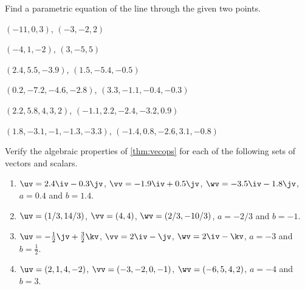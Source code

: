 \begin{exercise} \label{ex:} 
Find a parametric equation of the line through the given two points.
\begin{parts}
\item \((-11,0,3)\),
   \((-3,-2,2)\)

\item \((-4,1,-2)\),
   \((3,-5,5)\)

\item \((2.4,5.5,-3.9)\),
   \((1.5,-5.4,-0.5)\)

\item \((0.2,-7.2,-4.6,-2.8)\),
   \((3.3,-1.1,-0.4,-0.3)\)

\item \((2.2,5.8,4,3,2)\),
   \((-1.1,2.2,-2.4,-3.2,0.9)\)

\item \((1.8,-3.1,-1,-1.3,-3.3)\),
   \((-1.4,0.8,-2.6,3.1,-0.8)\)

\end{parts}
\end{exercise}



\begin{exercise} \label{ex:} 
Verify the algebraic properties of \autoref{thm:vecops} for each of the following sets of vectors and scalars.
\begin{enumerate}
\item \(\uv=2.4\iv-0.3\jv\), \(\vv=-1.9\iv+0.5\jv\), \(\wv=-3.5\iv-1.8\jv\), \(a=0.4\) and \(b=1.4\).
\item \(\uv=(1/3,14/3)\), \(\vv=(4,4)\), \(\wv=(2/3,-10/3)\), \(a=-2/3\) and \(b=-1\).
\item \(\uv=-\frac12\jv+\frac32\kv\), \(\vv=2\iv-\jv\), \(\wv=2\iv-\kv\), \(a=-3\) and \(b=\frac12\).
\item \(\uv=(2,1,4,-2)\), \(\vv=(-3,-2,0,-1)\), \(\wv=(-6,5,4,2)\), \(a=-4\) and \(b=3\).
\end{enumerate}
\end{exercise}




